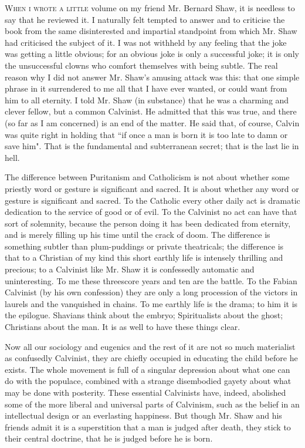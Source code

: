\documentclass[final,10pt,letterpaper,twocolumn,openany]{book}
\newcommand{\dcap}[2]{
	 \lettrine[nindent=0em,findent=2pt,lines=3,loversize=.15,lraise=0]{#1}{#2}
 }
\begin{document}
     \dcap{W}{hen i wrote a little} volume on my friend Mr. Bernard Shaw, it is
needless to say that he reviewed it. I naturally felt tempted to answer and
to criticise the book from the same disinterested and impartial standpoint
from which Mr. Shaw had criticised the subject of it. I was not withheld by
any feeling that the joke was getting a little obvious; for an obvious joke is
only a successful joke; it is only the unsuccessful clowns who comfort
themselves with being subtle. The real reason why I did not answer Mr.
Shaw's amusing attack was this: that one simple phrase in it surrendered to
me all that I have ever wanted, or could want from him to all eternity. I
told Mr. Shaw (in substance) that he was a charming and clever fellow, but
a common Calvinist. He admitted that this was true, and there (so far as I
am concerned) is an end of the matter. He said that, of course, Calvin was
quite right in holding that ``if once a man is born it is too late to damn or
save him". That is the fundamental and subterranean secret; that is the last
lie in hell.

The difference between Puritanism and Catholicism is not about
whether some priestly word or gesture is significant and sacred. It is about
whether any word or gesture is significant and sacred. To the Catholic
every other daily act is dramatic dedication to the service of good or of
evil. To the Calvinist no act can have that sort of solemnity, because the
person doing it has been dedicated from eternity, and is merely filling up
his time until the crack of doom. The difference is something subtler than
plum-puddings or private theatricals; the difference is that to a Christian of
my kind this short earthly life is intensely thrilling and precious; to a
Calvinist like Mr. Shaw it is confessedly automatic and uninteresting. To
me these threescore years and ten are the battle. To the Fabian Calvinist
(by his own confession) they are only a long procession of the victors in
laurels and the vanquished in chains. To me earthly life is the drama; to
him it is the epilogue. Shavians think about the embryo; Spiritualists about
the ghost; Christians about the man. It is as well to have these things clear.

Now all our sociology and eugenics and the rest of it are not so much
materialist as confusedly Calvinist, they are chiefly occupied in educating
the child before he exists. The whole movement is full of a singular
depression about what one can do with the populace, combined with a
strange disembodied gayety about what may be done with posterity. These
essential Calvinists have, indeed, abolished some of the more liberal and
universal parts of Calvinism, such as the belief in an intellectual design or
an everlasting happiness. But though Mr. Shaw and his friends admit it is a
superstition that a man is judged after death, they stick to their central
doctrine, that he is judged before he is born.
\end{document}
